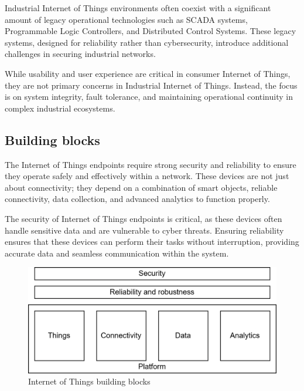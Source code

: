 Industrial Internet of Things environments often coexist with a significant amount of legacy operational technologies such as SCADA systems, Programmable Logic Controllers, and Distributed Control Systems. 
These legacy systems, designed for reliability rather than cybersecurity, introduce additional challenges in securing industrial networks.

While usability and user experience are critical in consumer Internet of Things, they are not primary concerns in Industrial Internet of Things. 
Instead, the focus is on system integrity, fault tolerance, and maintaining operational continuity in complex industrial ecosystems.

\subsection{Building blocks}
The Internet of Things endpoints require strong security and reliability to ensure they operate safely and effectively within a network. 
These devices are not just about connectivity; they depend on a combination of smart objects, reliable connectivity, data collection, and advanced analytics to function properly.

The security of Internet of Things endpoints is critical, as these devices often handle sensitive data and are vulnerable to cyber threats. 
Ensuring reliability ensures that these devices can perform their tasks without interruption, providing accurate data and seamless communication within the system.
\begin{figure}[H]
    \centering
    \includegraphics[width=0.5\linewidth]{images/bb.png}
    \caption{Internet of Things building blocks}
\end{figure}